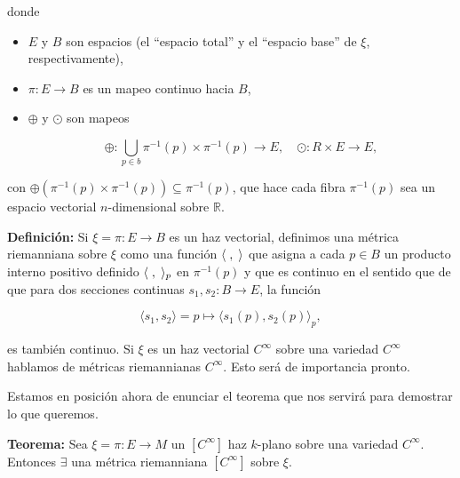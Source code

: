 \documentclass[a4paper,10pt]{article}
\numberwithin{equation}{section}
\newcommand{\definicion}{\textbf{Definición: }}
\newcommand{\teorema}{\textbf{Teorema: }}
\begin{document}
donde 

\begin{itemize}
 \item $E$ y $B$ son espacios (el ``espacio total'' y el ``espacio base'' de 
 $\xi$, respectivamente),
 \item $\pi: E \rightarrow B$ es un mapeo continuo hacia $B$,
 \item $\oplus$ y $\odot$ son mapeos
 
 \begin{equation}
  \oplus: \underset{p \in b}{\bigcup} \pi^{-1}(p) \times \pi^{-1}(p) \rightarrow E, \quad 
  \odot: R \times E \rightarrow E,
 \end{equation}
\end{itemize}

con $\oplus(\pi^{-1}(p) \times \pi^{-1}(p)) \subseteq \pi^{-1}(p)$, que hace 
cada fibra $\pi^{-1}(p)$ sea un espacio vectorial $n$-dimensional sobre 
$\mathbb{R}$.

\vspace{.3cm}

\definicion Si $\xi = \pi: E \rightarrow B$ es un haz vectorial, definimos 
una métrica riemanniana sobre $\xi$ como una función $\langle \hspace{.1cm}, \hspace{.1cm} \rangle$
que asigna a cada $p \in B$ un producto interno positivo definido $\langle \hspace{.1cm}, \hspace{.1cm} \rangle_p$
en $\pi^{-1}(p)$ y que es continuo en el sentido que de que para dos secciones continuas 
$s_1,s_2: B \rightarrow E$, la función

\begin{equation}
 \langle s_1, s_2 \rangle = p \mapsto \langle s_1(p), s_2(p) \rangle_p,
\end{equation}

es también continuo. Si $\xi$ es un haz vectorial $C^\infty$ sobre una variedad 
$C^\infty$ hablamos de métricas riemannianas $C^\infty$. Esto será de importancia pronto.

\vspace{.3cm}

Estamos en posición ahora de enunciar el teorema que nos servirá para 
demostrar lo que queremos.

\vspace{.3cm}

\teorema Sea $\xi = \pi: E \rightarrow M$ un $[C^\infty]$ haz $k$-plano
sobre una variedad $C^\infty$. Entonces $\exists$ una métrica riemanniana 
$[C^\infty]$ sobre $\xi$.
\end{document}
